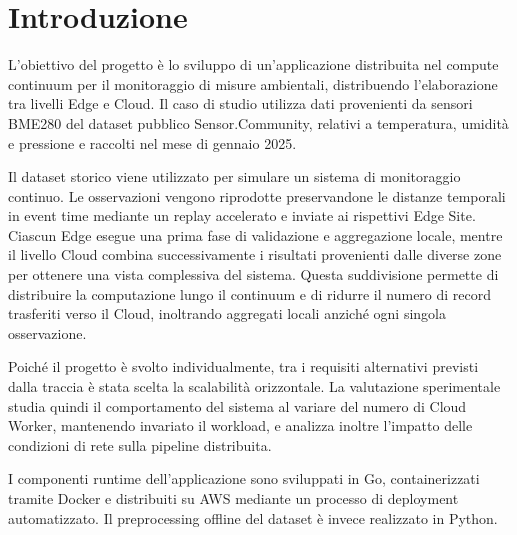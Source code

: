 \section{Introduzione}
\label{sec:introduzione}

L'obiettivo del progetto è lo sviluppo di un'applicazione distribuita
nel compute continuum per il monitoraggio di misure ambientali, distribuendo
l'elaborazione tra livelli Edge e Cloud. Il caso di studio utilizza dati
provenienti da sensori BME280 del dataset pubblico Sensor.Community, relativi
a temperatura, umidità e pressione e raccolti nel mese di gennaio 2025.

Il dataset storico viene utilizzato per simulare un sistema di monitoraggio
continuo. Le osservazioni vengono riprodotte preservandone le distanze
temporali in event time mediante un replay accelerato e inviate ai rispettivi
Edge Site. Ciascun Edge esegue una prima fase di validazione e aggregazione
locale, mentre il livello Cloud combina successivamente i risultati provenienti
dalle diverse zone per ottenere una vista complessiva del sistema. Questa
suddivisione permette di distribuire la computazione lungo il continuum e di
ridurre il numero di record trasferiti verso il Cloud, inoltrando aggregati
locali anziché ogni singola osservazione.

Poiché il progetto è svolto individualmente, tra i requisiti alternativi
previsti dalla traccia è stata scelta la scalabilità orizzontale. La
valutazione sperimentale studia quindi il comportamento del sistema al variare
del numero di Cloud Worker, mantenendo invariato il workload, e analizza
inoltre l'impatto delle condizioni di rete sulla pipeline distribuita.

I componenti runtime dell'applicazione sono sviluppati in Go, containerizzati
tramite Docker e distribuiti su AWS mediante un processo di deployment
automatizzato. Il preprocessing offline del dataset è invece realizzato in
Python.